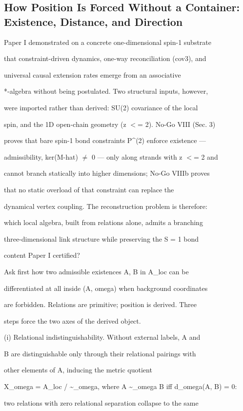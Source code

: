 \documentclass[11pt,a4paper]{article}
\theoremstyle{definition}
\begin{document}
\subsection{How Position Is Forced Without a Container: Existence, Distance, and Direction}
Paper I demonstrated on a concrete one-dimensional spin-1 substrate

that constraint-driven dynamics, one-way reconciliation (cov3), and

universal causal extension rates emerge from an associative

*-algebra without being postulated. Two structural inputs, however,

were imported rather than derived: SU(2) covariance of the local

spin, and the 1D open-chain geometry (z $<$= 2). No-Go VIII (Sec. 3)

proves that bare spin-1 bond constraints P\^{}(2) enforce existence —

admissibility, ker(M-hat) $\neq$ {0} — only along strands with z $<$= 2 and

cannot branch statically into higher dimensions; No-Go VIIIb proves

that no static overload of that constraint can replace the

dynamical vertex coupling. The reconstruction problem is therefore:

which local algebra, built from relations alone, admits a branching

three-dimensional link structure while preserving the S = 1 bond

content Paper I certified?


Ask first how two admissible existences A, B in A\_loc can be

differentiated at all inside (A, omega) when background coordinates

are forbidden. Relations are primitive; position is derived. Three

steps force the two axes of the derived object.


(i) Relational indistinguishability. Without external labels, A and

B are distinguishable only through their relational pairings with

other elements of A, inducing the metric quotient

X\_omega = A\_loc / \textasciitilde{}\_omega, where A \textasciitilde{}\_omega B iff d\_omega(A, B) = 0:

two relations with zero relational separation collapse to the same
\end{document}
